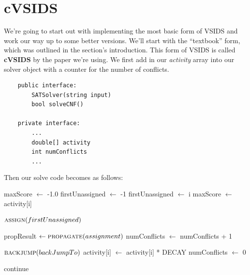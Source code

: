 \section{cVSIDS}

We're going to start out with implementing the most basic form of VSIDS and work our way 
up to some better versions. We'll start with the ``textbook'' form, which was outlined in 
the section's introduction. This form of VSIDS is called \textbf{cVSIDS} by the paper we're 
using. We first add in our \textit{activity} array into our solver 
object with a counter for the number of conflicts.
\begin{lstlisting}
    public interface:
        SATSolver(string input)
        bool solveCNF()

    private interface:
        ...
        double[] activity
        int numConflicts
        ...
\end{lstlisting}
Then our solve code becomes as follows:

\begin{algorithm}[H]
\caption{cVSIDS Solving Method}\label{alg:36}
\begin{algorithmic}[1]

\State {}

        \State maxScore $\gets$ -1.0
        \State firstUnassigned $\gets$ -1
                    \State firstUnassigned $\gets$ i
                    \State maxScore $\gets$ activity[i]
                \EndIf
            \EndIf
        \EndFor

        \State $\Call{assign}{firstUnassigned}$
    \EndIf

    \State propResult $\gets \Call{propagate}{assignment}$
        \State numConflicts $\gets$ numConflicts + 1

        \State {}

        \State $\Call{backjump}{backJumpTo}$
        \State {}
                \State activity[i] $\gets$ activity[i] * DECAY
            \EndFor
            \State numConflicts $\gets$ 0
        \EndIf

        \State continue
    \EndIf
\EndWhile

\EndProcedure
\end{algorithmic}
\end{algorithm}

